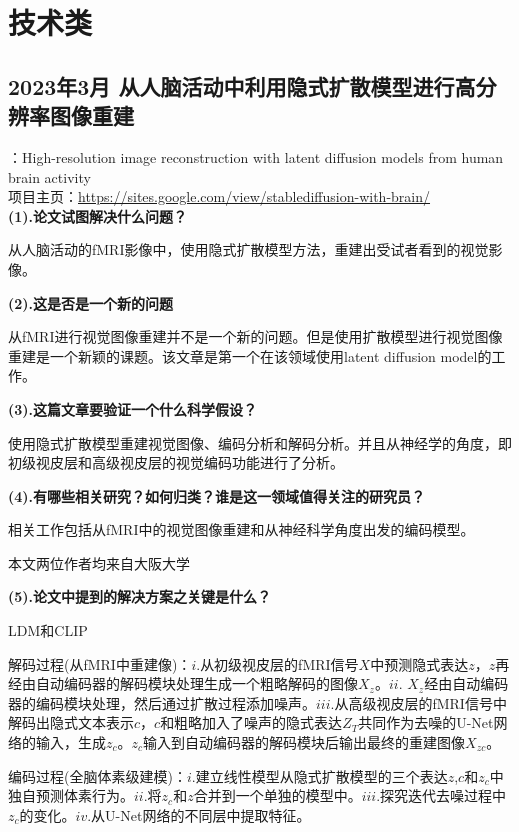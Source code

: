 \documentclass[12pt, a4paper, oneside]{ctexart}
\begin{document}
    \section{技术类}
    \subsection{2023年3月 从人脑活动中利用隐式扩散模型进行高分辨率图像重建\cite{takagi2023high}}
    ：High-resolution image reconstruction with latent diffusion models from human brain activity\\
    项目主页：\url{https://sites.google.com/view/stablediffusion-with-brain/}\\

    \noindent\textbf{(1).论文试图解决什么问题？}
    \setlength{\parindent}{5ex}

    从人脑活动的fMRI影像中，使用隐式扩散模型方法，重建出受试者看到的视觉影像。

    \noindent\textbf{(2).这是否是一个新的问题}

    从fMRI进行视觉图像重建并不是一个新的问题。但是使用扩散模型进行视觉图像重建是一个新颖的课题。该文章是第一个在该领域使用latent diffusion model的工作。

    \noindent\textbf{(3).这篇文章要验证一个什么科学假设？}

    使用隐式扩散模型重建视觉图像、编码分析和解码分析。并且从神经学的角度，即初级视皮层和高级视皮层的视觉编码功能进行了分析。

    \noindent\textbf{(4).有哪些相关研究？如何归类？谁是这一领域值得关注的研究员？}

    相关工作包括从fMRI中的视觉图像重建和从神经科学角度出发的编码模型。

    本文两位作者均来自大阪大学

    \noindent\textbf{(5).论文中提到的解决方案之关键是什么？}

    LDM和CLIP

    解码过程(从fMRI中重建像)：$i.$从初级视皮层的fMRI信号$X$中预测隐式表达$z$，$z$再经由自动编码器的解码模块处理生成一个粗略解码的图像$X_z$。$ii.$ $X_z$经由自动编码器的编码模块处理，然后通过扩散过程添加噪声。$iii.$从高级视皮层的fMRI信号中解码出隐式文本表示$c$，$c$和粗略加入了噪声的隐式表达$Z_T$共同作为去噪的U-Net网络的输入，生成$z_c$。$z_c$输入到自动编码器的解码模块后输出最终的重建图像$X_{zc}$。

    编码过程(全脑体素级建模)：$i.$建立线性模型从隐式扩散模型的三个表达$z$,$c$和$z_c$中独自预测体素行为。$ii.$将$z_c$和$z$合并到一个单独的模型中。$iii.$探究迭代去噪过程中$z_c$的变化。$iv.$从U-Net网络的不同层中提取特征。
\end{document}
